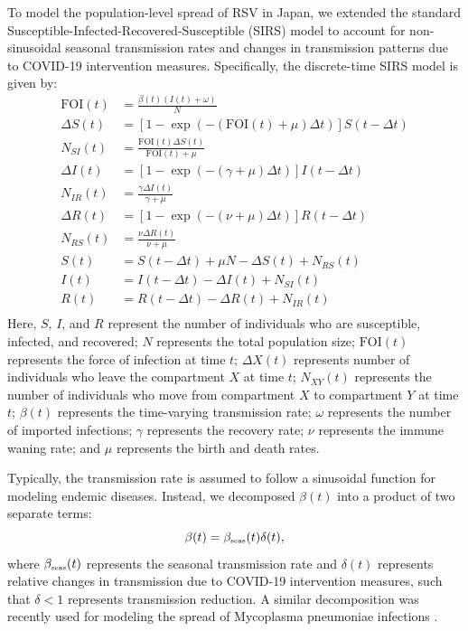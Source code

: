 \documentclass[12pt]{article}
\newcommand{\tsub}[2]{#1_{{\textrm{\tiny #2}}}}
\begin{document}
To model the population-level spread of RSV in Japan, we extended the standard Susceptible-Infected-Recovered-Susceptible (SIRS) model to account for non-sinusoidal seasonal transmission rates and changes in transmission patterns due to COVID-19 intervention measures.
Specifically, the discrete-time SIRS model is given by:
\begin{align}
\mathrm{FOI}(t) &= \frac{\beta(t) (I(t) + \omega)}{N}\\
\Delta S(t) &= \left[1- \exp(-(\mathrm{FOI}(t) + \mu) \Delta t )\right] S(t-\Delta t)\\
N_{SI}(t) &= \frac{\mathrm{FOI}(t)\Delta S(t)}{\mathrm{FOI}(t) + \mu} \\
\Delta I(t) &= \left[1- \exp(-(\gamma + \mu) \Delta t )\right] I(t-\Delta t)\\
N_{IR}(t) &= \frac{\gamma \Delta I(t)}{\gamma + \mu} \\
\Delta R(t) &= \left[1- \exp(-(\nu + \mu) \Delta t )\right] R(t-\Delta t)\\
N_{RS}(t) &= \frac{\nu \Delta R(t)}{\nu + \mu} \\
S(t) &= S(t-\Delta t) + \mu N - \Delta S(t) + N_{RS}(t)  \\
I(t) &= I(t-\Delta t) - \Delta I(t) + N_{SI}(t)  \\
R(t) &= R(t-\Delta t) - \Delta R(t) + N_{IR}(t)  \\
\end{align}
Here, $S$, $I$, and $R$ represent the number of individuals who are susceptible, infected, and recovered;
$N$ represents the total population size;
$\mathrm{FOI}(t)$ represents the force of infection at time $t$;
$\Delta X(t)$ represents number of individuals who leave the compartment $X$ at time $t$;
$N_{XY}(t)$ represents the number of individuals who move from compartment $X$ to compartment $Y$ at time $t$;
$\beta(t)$ represents the time-varying transmission rate;
$\omega$ represents the number of imported infections;
$\gamma$ represents the recovery rate;
$\nu$ represents the immune waning rate;
and $\mu$ represents the birth and death rates.

Typically, the transmission rate is assumed to follow a sinusoidal function for modeling endemic diseases.
Instead, we decomposed $\beta(t)$ into a product of two separate terms:
\begin{equation}
\beta(t) = \tsub{\beta}{seas}(t) \delta(t),
\end{equation}
where $\tsub{\beta}{seas}(t)$ represents the seasonal transmission rate and $\delta(t)$ represents relative changes in transmission due to COVID-19 intervention measures, such that $\delta < 1$ represents transmission reduction.
A similar decomposition was recently used for modeling the spread of Mycoplasma pneumoniae infections \citep{park2024myco}.
\end{document}
